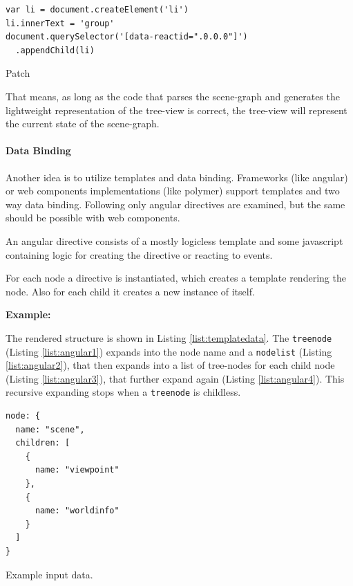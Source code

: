 \begin{listing}[H]
  \begin{verbatim}
var li = document.createElement('li')
li.innerText = 'group'
document.querySelector('[data-reactid=".0.0.0"]')
  .appendChild(li)
  \end{verbatim}
  \caption{Patch}
  \label{patch}
\end{listing}

That means, as long as the code that parses the scene-graph and generates the
lightweight representation of the tree-view is correct, the tree-view will
represent the current state of the scene-graph.

\paragraph{Data Binding}
\label{data-binding}

Another idea is to utilize templates and data binding. Frameworks (like
angular) or web components implementations (like polymer)
support templates and two way data binding. Following only
angular directives are examined, but the same should be possible with web
components.

An angular directive consists of a mostly logicless template and some
javascript containing logic for creating the directive or reacting to
events.

For each node a directive is instantiated, which creates a template
rendering the node. Also for each child it creates a new instance of
itself.

\textbf{Example:}

The rendered structure is shown in Listing \ref{list:templatedata}. The
\texttt{treenode} (Listing \ref{list:angular1}) expands into the node name and a
\texttt{nodelist} (Listing \ref{list:angular2}), that then expands into a list
of tree-nodes for each child node (Listing \ref{list:angular3}), that further
expand again (Listing \ref{list:angular4}). This recursive expanding stops when a
\texttt{treenode} is childless.

\begin{listing}[H]
  \begin{verbatim}
node: {
  name: "scene",
  children: [
    {
      name: "viewpoint"
    },
    {
      name: "worldinfo"
    }
  ]
}
  \end{verbatim}
  \caption{Example input data.}
  \label{list:templatedata}
\end{listing}

